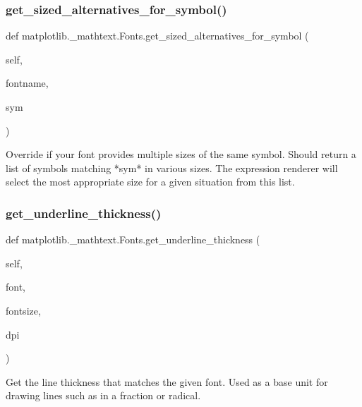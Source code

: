 \subsubsection{\texorpdfstring{get\+\_\+sized\+\_\+alternatives\+\_\+for\+\_\+symbol()}{get\_sized\_alternatives\_for\_symbol()}}
{\footnotesize\ttfamily def matplotlib.\+\_\+mathtext.\+Fonts.\+get\+\_\+sized\+\_\+alternatives\+\_\+for\+\_\+symbol (\begin{DoxyParamCaption}\item[{}]{self,  }\item[{}]{fontname,  }\item[{}]{sym }\end{DoxyParamCaption})}

\begin{DoxyVerb}Override if your font provides multiple sizes of the same
symbol.  Should return a list of symbols matching *sym* in
various sizes.  The expression renderer will select the most
appropriate size for a given situation from this list.
\end{DoxyVerb}
 \mbox{\label{classmatplotlib_1_1__mathtext_1_1Fonts_a221da18a4d54c041734a77d00484b875}} 
\subsubsection{\texorpdfstring{get\+\_\+underline\+\_\+thickness()}{get\_underline\_thickness()}}
{\footnotesize\ttfamily def matplotlib.\+\_\+mathtext.\+Fonts.\+get\+\_\+underline\+\_\+thickness (\begin{DoxyParamCaption}\item[{}]{self,  }\item[{}]{font,  }\item[{}]{fontsize,  }\item[{}]{dpi }\end{DoxyParamCaption})}

\begin{DoxyVerb}Get the line thickness that matches the given font.  Used as a
base unit for drawing lines such as in a fraction or radical.
\end{DoxyVerb}
 \mbox{\label{classmatplotlib_1_1__mathtext_1_1Fonts_a541083e50d7b30cba251107b381a4f36}} 
